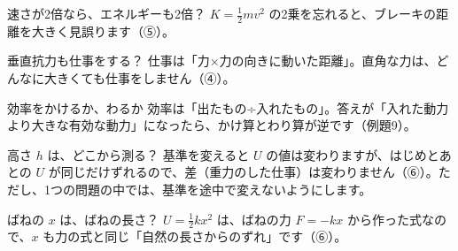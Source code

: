 \begin{tsumazuki}{速さが2倍なら、エネルギーも2倍？}
$K=\tfrac{1}{2}mv^2$ の2乗を忘れると、ブレーキの距離を大きく見誤ります（⑤）。
\end{tsumazuki}

\begin{tsumazuki}{垂直抗力も仕事をする？}
仕事は「力×力の向きに動いた距離」。直角な力は、どんなに大きくても仕事をしません（④）。
\end{tsumazuki}

\begin{tsumazuki}{効率をかけるか、わるか}
効率は「出たもの÷入れたもの」。答えが「入れた動力より大きな有効な動力」になったら、かけ算とわり算が逆です（例題9）。
\end{tsumazuki}

\begin{tsumazuki}{高さ $h$ は、どこから測る？}
基準を変えると $U$ の値は変わりますが、はじめとあとの $U$ が同じだけずれるので、差（重力のした仕事）は変わりません（⑥）。ただし、1つの問題の中では、基準を途中で変えないようにします。
\end{tsumazuki}

\begin{tsumazuki}{ばねの $x$ は、ばねの長さ？}
$U=\tfrac{1}{2}kx^2$ は、ばねの力 $F=-kx$ から作った式なので、$x$ も力の式と同じ「自然の長さからのずれ」です（⑥）。
\end{tsumazuki}

